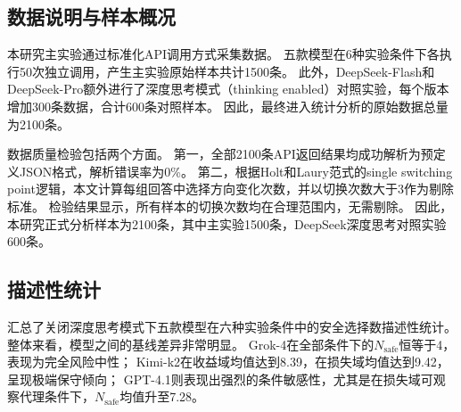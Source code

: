 \documentclass[journal]{vgtc}
\begin{document}
\subsection{数据说明与样本概况}

本研究主实验通过标准化API调用方式采集数据。
五款模型在6种实验条件下各执行50次独立调用，产生主实验原始样本共计1500条。
此外，DeepSeek-Flash和DeepSeek-Pro额外进行了深度思考模式（thinking enabled）对照实验，每个版本增加300条数据，合计600条对照样本。
因此，最终进入统计分析的原始数据总量为2100条。

数据质量检验包括两个方面。
第一，全部2100条API返回结果均成功解析为预定义JSON格式，解析错误率为0\%。
第二，根据Holt和Laury范式的single switching point逻辑，本文计算每组回答中选择方向变化次数，并以切换次数大于3作为剔除标准。
检验结果显示，所有样本的切换次数均在合理范围内，无需剔除。
因此，本研究正式分析样本为2100条，其中主实验1500条，DeepSeek深度思考对照实验600条。

\subsection{描述性统计}

汇总了关闭深度思考模式下五款模型在六种实验条件中的安全选择数描述性统计。
整体来看，模型之间的基线差异非常明显。
Grok-4在全部条件下的$N_{\text{safe}}$恒等于4，表现为完全风险中性；
Kimi-k2在收益域均值达到8.39，在损失域均值达到9.42，呈现极端保守倾向；
GPT-4.1则表现出强烈的条件敏感性，尤其是在损失域可观察代理条件下，$N_{\text{safe}}$均值升至7.28。
\end{document}
